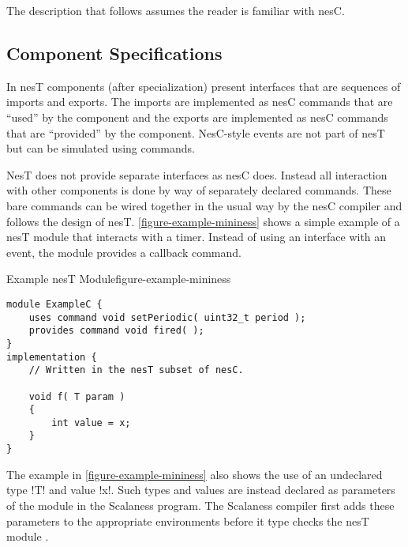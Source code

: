 The description that follows assumes the reader is familiar with nesC.


\subsection{Component Specifications}
\label{section-component-specifications}

In nesT components (after specialization) present interfaces that are sequences of imports and
exports. The imports are implemented as nesC commands that are ``used'' by the component and the
exports are implemented as nesC commands that are ``provided'' by the component. NesC-style
events are not part of nesT but can be simulated using commands.


NesT does not provide separate interfaces as nesC does. Instead all interaction with other
components is done by way of separately declared commands. These bare commands can be wired
together in the usual way by the nesC compiler \cite{Gay-nesC-2003} and follows the design of
nesT. \autoref{figure-example-mininess} shows a simple example of a nesT module that interacts
with a timer. Instead of using an interface with an event, the module provides a callback
command.

\singlespace
\begin{fpfig}[tbhp]{Example nesT Module}{figure-example-mininess}
{
\begin{lstlisting}[language=nesC]
module ExampleC {
    uses command void setPeriodic( uint32_t period );
    provides command void fired( );
}
implementation {
    // Written in the nesT subset of nesC.

    void f( T param )
    {
        int value = x;
    }
}
\end{lstlisting}
}
\end{fpfig}
\primaryspacing

The example in \autoref{figure-example-mininess} also shows the use of an undeclared type !T!
and value !x!. Such types and values are instead declared as parameters of the module in the
Scalaness program. The Scalaness compiler first adds these parameters to the appropriate
environments before it type checks the nesT module \cite{watson-masters-2013}.


